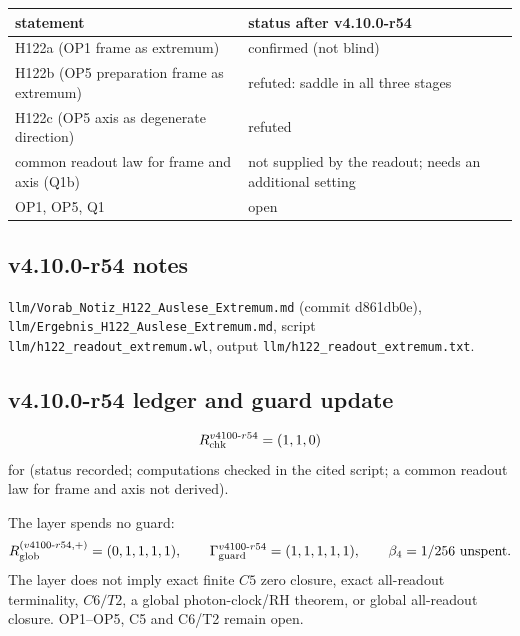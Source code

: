 \begin{center}
\small
\begin{tabular}{@{}>{\raggedright\arraybackslash}p{}>{\raggedright\arraybackslash}p{}@{}}
\toprule
statement & status after v4.10.0-r54\\
\midrule
H122a (OP1 frame as extremum) & confirmed (not blind)\\
H122b (OP5 preparation frame as extremum) & refuted: saddle in all three stages\\
H122c (OP5 axis as degenerate direction) & refuted\\
common readout law for frame and axis (Q1b) & not supplied by the readout; needs an additional setting\\
OP1, OP5, Q1 & open\\
\bottomrule
\end{tabular}
\end{center}

\subsection*{v4.10.0-r54 notes}
\label{subsec:v4100-r54-notes}

\texttt{llm/\allowbreak Vorab\_\allowbreak Notiz\_\allowbreak H122\_\allowbreak Auslese\_\allowbreak Extremum.md} (commit d861db0e),
\texttt{llm/\allowbreak Ergebnis\_\allowbreak H122\_\allowbreak Auslese\_\allowbreak Extremum.md}, script \texttt{llm/\allowbreak h122\_\allowbreak readout\_\allowbreak extremum.wl},
output \texttt{llm/\allowbreak h122\_\allowbreak readout\_\allowbreak extremum.txt}.

\subsection*{v4.10.0-r54 ledger and guard update}
\label{subsec:v4100-r54-ledger-guard}

\[
R_{\rm chk}^{v4100\text{-}r54}=(1,1,0)
\]
for (status recorded; computations checked in the cited script; a common readout law for frame and axis not derived).

The layer spends no guard:
\[
R_{\rm glob}^{(v4100\text{-}r54,+)}=(0,1,1,1,1),
\qquad
\Gamma_{\rm guard}^{v4100\text{-}r54}=(1,1,1,1,1),
\qquad
\beta_4=1/256\ \text{unspent}.
\]
The layer does not imply exact finite \(C5\) zero closure, exact all-readout terminality, \(C6/T2\), a global photon-clock/RH theorem,
or global all-readout closure.  OP1--OP5, C5 and C6/T2 remain open.
